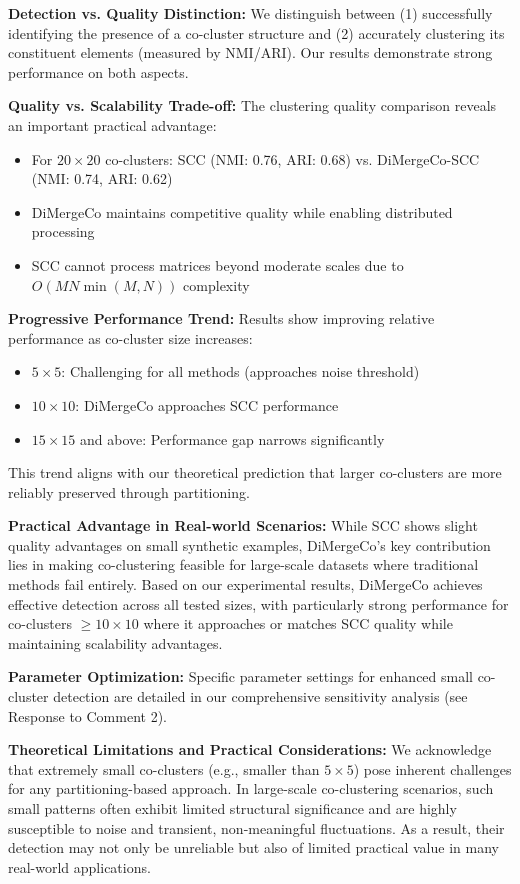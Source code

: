 \documentclass{ar2rc}
\begin{document}
\textbf{Detection vs. Quality Distinction:} We distinguish between (1) successfully identifying the presence of a co-cluster structure and (2) accurately clustering its constituent elements (measured by NMI/ARI). Our results demonstrate strong performance on both aspects.

\textbf{Quality vs. Scalability Trade-off:} The clustering quality comparison reveals an important practical advantage:
\begin{itemize}
  \item For $20 \times 20$ co-clusters: SCC (NMI: 0.76, ARI: 0.68) vs. DiMergeCo-SCC (NMI: 0.74, ARI: 0.62)
  \item DiMergeCo maintains competitive quality while enabling distributed processing
  \item SCC cannot process matrices beyond moderate scales due to $O(MN \min(M,N))$ complexity
\end{itemize}

\textbf{Progressive Performance Trend:} Results show improving relative performance as co-cluster size increases:
\begin{itemize}
  \item $5 \times 5$: Challenging for all methods (approaches noise threshold)
  \item $10 \times 10$: DiMergeCo approaches SCC performance
  \item $15 \times 15$ and above: Performance gap narrows significantly
\end{itemize}
This trend aligns with our theoretical prediction that larger co-clusters are more reliably preserved through partitioning.

\textbf{Practical Advantage in Real-world Scenarios:} While SCC shows slight quality advantages on small synthetic examples, DiMergeCo's key contribution lies in making co-clustering feasible for large-scale datasets where traditional methods fail entirely. Based on our experimental results, DiMergeCo achieves effective detection across all tested sizes, with particularly strong performance for co-clusters $\geq 10 \times 10$ where it approaches or matches SCC quality while maintaining scalability advantages.

\textbf{Parameter Optimization:} Specific parameter settings for enhanced small co-cluster detection are detailed in our comprehensive sensitivity analysis (see Response to Comment 2).

\textbf{Theoretical Limitations and Practical Considerations:}
We acknowledge that extremely small co-clusters (e.g., smaller than $5 \times 5$) pose inherent challenges for any partitioning-based approach. In large-scale co-clustering scenarios, such small patterns often exhibit limited structural significance and are highly susceptible to noise and transient, non-meaningful fluctuations. As a result, their detection may not only be unreliable but also of limited practical value in many real-world applications.
\end{document}
